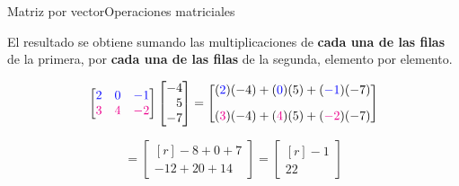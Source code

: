 \documentclass[spanish, c]{beamer}
\begin{document}
\begin{frame}{Matriz por vector}{Operaciones matriciales}    

    El resultado se obtiene sumando las multiplicaciones de \textbf{cada una de las filas} de la primera, por \textbf{cada una de las filas} de la segunda, elemento por elemento.

    \[%
        \begin{bmatrix*}[r]
            {\color{blue} 2} & {\color{blue} 0} & {\color{blue} -1}\\
            {\color{magenta} 3} & {\color{magenta} 4} & {\color{magenta} -2}
        \end{bmatrix*}
        \begin{bmatrix*}[r]
            -4 \\
            5 \\
            -7
        \end{bmatrix*} =
        \begin{bmatrix*}[r]
            {({\color{blue} 2})}(-4) + {({\color{blue} 0})}(5) + {({\color{blue} -1})}(-7) \\[2ex]
            {({\color{magenta} 3})}(-4) + {({\color{magenta} 4})}(5) + {({\color{magenta} -2})}(-7)
        \end{bmatrix*}
    \]

    \bigskip

    \[%
        =
        \begin{bmatrix*}[r]
            -8 + 0 + 7 \\
            -12 + 20 +14
        \end{bmatrix*} =
        \begin{bmatrix*}[r]
            -1 \\
            22
        \end{bmatrix*}
    \]
\end{frame}
\end{document}
